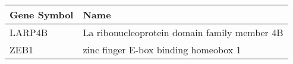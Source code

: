 \begin{tabular}{ll}
\toprule
Gene Symbol &                                         Name \\
\midrule
     LARP4B & La ribonucleoprotein domain family member 4B \\
       ZEB1 &         zinc finger E-box binding homeobox 1 \\
\bottomrule
\end{tabular}
